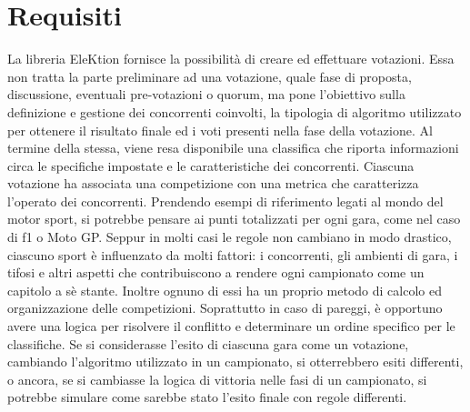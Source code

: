 \documentclass[12pt,a4paper,openright,twoside]{book}
\begin{document}
\section{Requisiti}
La libreria EleKtion fornisce la possibilità di creare ed effettuare votazioni.
Essa non tratta la parte preliminare ad una votazione, quale fase di proposta, discussione,
eventuali pre-votazioni o quorum, ma pone l'obiettivo sulla definizione e gestione dei concorrenti coinvolti,
la tipologia di algoritmo utilizzato per ottenere il risultato finale ed i voti presenti nella fase della votazione.
Al termine della stessa, viene resa disponibile una classifica che riporta informazioni 
circa le specifiche impostate e le caratteristiche dei concorrenti.
Ciascuna votazione ha associata una competizione con una metrica che caratterizza l'operato dei concorrenti.
Prendendo esempi di riferimento legati al mondo del motor sport,
si potrebbe pensare ai punti totalizzati per ogni gara, come nel caso di \ac{f1} o Moto GP.
Seppur in molti casi le regole non cambiano in modo drastico, ciascuno sport è influenzato da molti fattori:
i concorrenti, gli ambienti di gara, i tifosi e altri aspetti che contribuiscono a rendere 
ogni campionato come un capitolo a sè stante. 
Inoltre ognuno di essi ha un proprio metodo di calcolo ed organizzazione delle competizioni. 
Soprattutto in caso di pareggi, è opportuno avere una logica per risolvere il conflitto e determinare un ordine specifico per
le classifiche. 
Se si considerasse l'esito di ciascuna gara come un votazione, cambiando
l'algoritmo utilizzato in un campionato, si otterrebbero esiti differenti, o ancora,
se si cambiasse la logica di vittoria nelle fasi di un campionato, si potrebbe simulare come
sarebbe stato l'esito finale con regole differenti.
\end{document}
